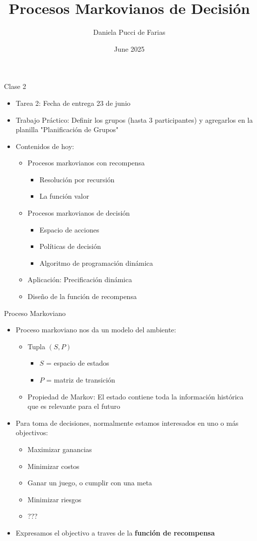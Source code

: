 \documentclass[handout]{beamer}
\title{Procesos Markovianos de Decisión}
\author{Daniela Pucci de Farias}
\institute{Universidad Torcuato Di Tella}
\date{June 2025}
\begin{document}
\frame{\titlepage}

\begin{frame}{Clase 2}
\begin{itemize}
\item Tarea 2: Fecha de entrega 23 de junio
\item Trabajo Práctico: Definir los grupos (hasta 3 participantes) y agregarlos en la planilla "Planificación de Grupos"
\item<2-> Contenidos de hoy:
\begin{itemize}
\item<2-> Procesos markovianos con recompensa
\begin{itemize}
\item<3-> Resolución por recursión
\item<4-> La función valor
\end{itemize}
\item<5-> Procesos markovianos de decisión 
\begin{itemize}
\item<6-> Espacio de acciones
\item<7-> Políticas de decisión
\item<8-> Algoritmo de programación dinámica
\end{itemize}
\item<9-> Aplicación: Precificación dinámica
\item<10-> Diseño de la función de recompensa
\end{itemize}
\end{itemize}
\end{frame}

\begin{frame}{Proceso Markoviano}
\begin{itemize}
\item Proceso markoviano nos da un modelo del ambiente:
\begin{itemize}
\item<2-> Tupla $(S,P)$
\begin{itemize}
\item<2-> $S$ = espacio de estados
\item<2-> $P$ = matriz de transición
\end{itemize}
\item<3-> Propiedad de Markov: El estado contiene toda la información histórica que es relevante para el futuro
\end{itemize}
\item<4-> Para toma de decisiones, normalmente estamos interesados en uno o más objectivos:
\begin{itemize}
\item<5-> Maximizar ganancias
\item<6-> Minimizar costos
\item<7-> Ganar un juego, o cumplir con una meta
\item<8-> Minimizar riesgos
\item<9-> ???
\end{itemize}
\item<10-> Expresamos el objectivo a traves de la {\bf función de recompensa}
\end{itemize}
\end{frame}
\end{document}
